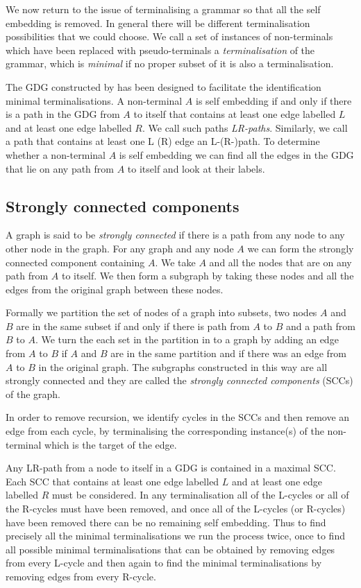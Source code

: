 We now return to the issue of terminalising a grammar so that all the
self embedding is removed. 
In general there will be different terminalisation possibilities that 
we could choose. We call a set of instances of non-terminals
which have been replaced with pseudo-terminals
a {\em terminalisation} of the grammar, which 
is {\em minimal} if no proper subset of it is also a terminalisation.


The GDG constructed by \gtb has been designed to 
facilitate the identification minimal terminalisations. 
A non-terminal
$A$ is self embedding if and only if there is a path in the GDG
from $A$ to itself that contains at least one edge labelled $L$ and at
least one edge labelled $R$. We call such paths 
{\em LR-paths}. Similarly, we call a path that contains at least one L
(R) edge an L-(R-)path. To determine whether a non-terminal
$A$ is self embedding we can find all the edges in the GDG that lie on
any path from $A$ to itself and look at their labels.


\subsection{Strongly connected components}

A graph is said to be {\em strongly connected} if there is a path from any
node to any other node in the graph.
For any graph and any node $A$ we can form the strongly
connected component containing $A$. We take $A$ and all the nodes that
are on any path from $A$ to itself. We then form a subgraph by taking
these nodes and all the edges from the original graph between these
nodes.

Formally we partition the set of nodes of a graph into subsets, two
nodes $A$ and $B$ are in the same subset if and only if there is path
from $A$ to $B$ and a path from $B$ to $A$. We turn the each set
in the partition in to a graph by adding an edge from $A$ to $B$
if $A$ and $B$ are in the same partition and if there was an edge from
$A$ to $B$ in the original graph. The subgraphs constructed in this
way are all strongly connected and they are called the {\em strongly
connected components} (SCCs) of the graph.


In order to remove recursion, we identify cycles in the SCCs
and then remove an edge from each cycle, by terminalising the 
corresponding instance(s)
of the non-terminal which is the target of the edge.  

Any LR-path from a node to itself in a GDG is contained in a maximal SCC.
Each SCC that contains at least one edge labelled $L$ and at least one
edge labelled $R$ must be considered. 
In any terminalisation all of the L-cycles or all of the
R-cycles must have been removed, and once all of the L-cycles
(or R-cycles) have been removed there can be no remaining self
embedding. Thus to find precisely all the minimal
terminalisations we run the process twice, once to find all possible
minimal terminalisations that can be obtained by removing edges from
every L-cycle and then again to find the minimal terminalisations 
by removing edges from every R-cycle. 


